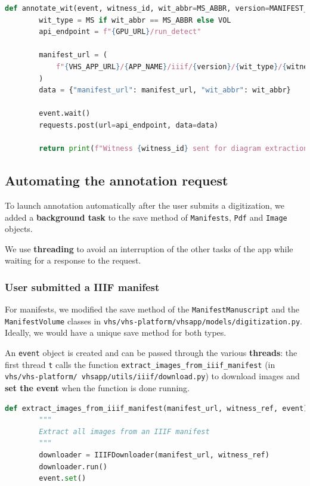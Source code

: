 	\begin{lstlisting}[language=Python]
	def annotate_wit(event, witness_id, wit_abbr=MS_ABBR, version=MANIFEST_AUTO):
		wit_type = MS if wit_abbr == MS_ABBR else VOL
		api_endpoint = f"{GPU_URL}/run_detect"
	
		manifest_url = (
			f"{VHS_APP_URL}/{APP_NAME}/iiif/{version}/{wit_type}/{witness_id}/manifest.json"
		)
		data = {"manifest_url": manifest_url, "wit_abbr": wit_abbr}
	
		event.wait()
		requests.post(url=api_endpoint, data=data)
		
		return print(f"Witness {witness_id} sent for diagram extraction")\end{lstlisting}
	
	\subsection{Automating the annotation request}
	To launch annotation automatically after the user submits a digitization, we added a \textbf{background task} to the save method of \texttt{Manifests}, \texttt{Pdf} and \texttt{Image} objects.
	
	We use \textbf{threading} to avoid an interruption of the other tasks of the app while waiting for a response to the request.

		\subsubsection{User submitted a IIIF manifest}
		For manifests, we modified the save method of the \texttt{ManifestManuscript} and the \texttt{ManifestVolume} classes in \texttt{vhs/vhs-platform/vhsapp/models/digitization.py}. Ideally, we would have a unique save method for both types.
		
		An \texttt{event} object is created and can be passed through the various \textbf{threads}: the first thread \texttt{t} calls the function \texttt{extract\_images\_from\_iiif\_manifest} (in \texttt{vhs/vhs-platform/ vhsapp/utils/iiif/download.py}) to download images and \textbf{set the event} when the function is done running.

		\begin{lstlisting}[language=Python]
	def extract_images_from_iiif_manifest(manifest_url, witness_ref, event):
		"""
		Extract all images from an IIIF manifest
		"""
		downloader = IIIFDownloader(manifest_url, witness_ref)
		downloader.run()
		event.set()\end{lstlisting}


